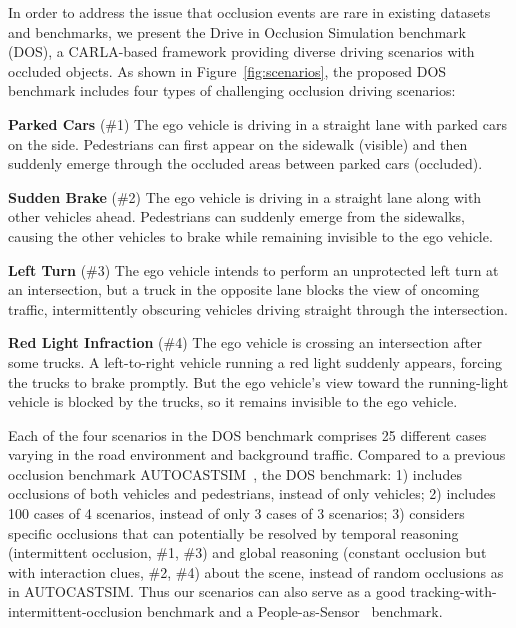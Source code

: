 \documentclass[10pt,twocolumn,letterpaper]{article}
\begin{document}
In order to address the issue that occlusion events are rare in existing datasets and benchmarks, we present the Drive in Occlusion Simulation benchmark (DOS), a CARLA-based framework providing diverse driving scenarios with occluded objects. As shown in Figure~\ref{fig:scenarios}, the proposed DOS benchmark includes four types of challenging occlusion driving scenarios: 

\vspace{0.4em}
\noindent\textbf{Parked Cars} (\#1) The ego vehicle is driving in a straight lane with parked cars on the side. Pedestrians can first appear on the sidewalk (visible) and then suddenly emerge through the occluded areas between parked cars (occluded).

\noindent\textbf{Sudden Brake} (\#2) The ego vehicle is driving in a straight lane along with other vehicles ahead. Pedestrians can suddenly emerge from the sidewalks, causing the other vehicles to brake while remaining invisible to the ego vehicle.

\noindent\textbf{Left Turn} (\#3) The ego vehicle intends to perform an unprotected left turn at an intersection, but a truck in the opposite lane blocks the view of oncoming traffic, intermittently obscuring vehicles driving straight through the intersection.

\noindent\textbf{Red Light Infraction} (\#4) The ego vehicle is crossing an intersection after some trucks. A left-to-right vehicle running a red light suddenly appears, forcing the trucks to brake promptly. But the ego vehicle's view toward the running-light vehicle is blocked by the trucks, so it remains invisible to the ego vehicle.



\vspace{0.4em}


Each of the four scenarios in the DOS benchmark comprises 25 different cases varying in the road environment and background traffic. Compared to a previous occlusion benchmark AUTOCASTSIM~\cite{cui2022coopernaut}, the DOS benchmark: 1) includes occlusions of both vehicles and pedestrians, instead of only vehicles; 2) includes 100 cases of 4 scenarios, instead of only 3 cases of 3 scenarios; 3) considers specific occlusions that can potentially be resolved by temporal reasoning (intermittent occlusion, \#1, \#3) and global reasoning (constant occlusion but with interaction clues, \#2, \#4) about the scene, instead of random occlusions as in AUTOCASTSIM. Thus our scenarios can also serve as a good tracking-with-intermittent-occlusion benchmark and a People-as-Sensor~\cite{afolabi2018people,itkina2022multi} benchmark.
\end{document}
